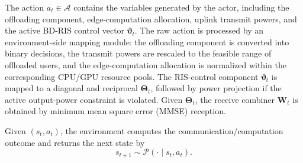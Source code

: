 \documentclass[conference]{IEEEtran}
\begin{document}
The action \(a_t\in\mathcal{A}\) contains the variables generated by the actor, including the offloading component, edge-computation allocation, uplink transmit powers, and the active BD-RIS control vector \(\boldsymbol{\vartheta}_t\). The raw action is processed by an environment-side mapping module: the offloading component is converted into binary decisions, the transmit powers are rescaled to the feasible range of offloaded users, and the edge-computation allocation is normalized within the corresponding CPU/GPU resource pools. The RIS-control component \(\boldsymbol{\vartheta}_t\) is mapped to a diagonal and reciprocal \(\mathbf{\Theta}_t\), followed by power projection if the active output-power constraint is violated. Given \(\mathbf{\Theta}_t\), the receive combiner \(\mathbf{W}_t\) is obtained by minimum mean square error (MMSE) reception.


Given $(s_t,a_t)$, the environment computes the communication/computation outcome and returns the next state by
\begin{equation}
s_{t+1}\sim \mathcal{P}(\cdot\mid s_t,a_t).
\end{equation}
\end{document}
